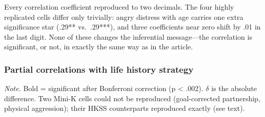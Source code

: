 \documentclass[
  english,
  man,floatsintext]{apa6}
\begin{document}
Every correlation coefficient reproduced to two decimals. The four highly replicated cells differ only trivially: angry distress with age carries one extra significance star (.29** vs.~.29***), and three coefficients near zero shift by .01 in the last digit. None of these changes the inferential message---the correlation is significant, or not, in exactly the same way as in the article.

\subsubsection{Partial correlations with life history strategy}\label{partial-correlations-with-life-history-strategy}

\begin{center}
\begin{ThreePartTable}

\begin{TableNotes}[para]
\normalsize{\textit{Note.} Bold = significant after Bonferroni correction (p < .002). $\delta$ is the absolute difference. Two Mini-K cells could not be reproduced (goal-corrected partnership, physical aggression); their HKSS counterparts reproduced exactly (see text).}
\end{TableNotes}

\small{

}
\end{ThreePartTable}
\end{center}
\end{document}
